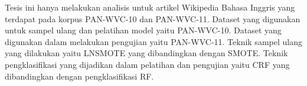 Tesis ini hanya melakukan analisis untuk artikel Wikipedia Bahasa Inggris yang
terdapat pada korpus PAN-WVC-10 dan PAN-WVC-11.
Dataset yang digunakan untuk sampel ulang dan pelatihan model yaitu PAN-WVC-10.
Dataset yang digunakan dalam melakukan pengujian yaitu PAN-WVC-11.
Teknik sampel ulang yang dilakukan yaitu LNSMOTE yang dibandingkan dengan
SMOTE.
Teknik pengklasifikasi yang dijadikan dalam pelatihan dan pengujian yaitu CRF
yang dibandingkan dengan pengklasifikasi RF.
